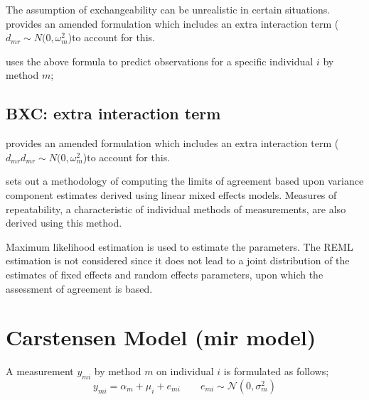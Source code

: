 \documentclass[12pt, a4paper]{report}
\theoremstyle{plain}
\theoremstyle{definition}
\theoremstyle{remark}
\begin{document}
The assumption of exchangeability can
be unrealistic in certain situations. \citet{BXC2004} provides an
amended formulation which includes an extra interaction term ($
d_{mr} \sim N(0,\omega^{2}_{m}$)to account for this.

\citet{BXC2004} uses the above formula to predict observations for
a specific individual $i$ by method $m$;


\subsection{BXC: extra interaction term}


\citet{BXC2004} provides an amended formulation which includes an extra interaction
term ($d_{mr} d_{mr} \sim N(0,\omega^{2}_{m}$)to account for this.

\citet{BXC2008} sets out a methodology of computing the limits of
agreement based upon variance component estimates derived using
linear mixed effects models. Measures of repeatability, a
characteristic of individual methods of measurements, are also
derived using this method.






Maximum likelihood estimation is used to estimate the parameters.
The REML estimation is not considered since it does not lead to a
joint distribution of the estimates of fixed effects and random
effects parameters, upon which the assessment of agreement is
based.




\section{Carstensen Model (mir model)}

A measurement $y_{mi}$ by method $m$ on individual $i$ is formulated as follows;
\begin{equation}
y_{mi}  = \alpha_{m} + \mu_{i} + e_{mi} \qquad  e_{mi} \sim
\mathcal{N}(0,\sigma^{2}_{m})
\end{equation}
\end{document}
